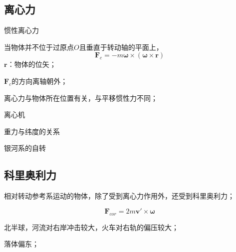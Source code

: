 \documentclass[12pt,a4paper]{article}
\renewcommand{\vec}[1]{\boldsymbol{#1}}
\begin{document}
\subsection{离心力}
惯性离心力

当物体并不位于过原点$O$且垂直于转动轴的平面上，
\begin{equation}
\vec{F}_c = -m\vec{\omega} \times (\vec{\omega} \times \vec{r})
\end{equation}
$\vec{r}$：物体的位矢；

$\vec{F}_c$的方向离轴朝外；

离心力与物体所在位置有关，与平移惯性力不同；

离心机

重力与纬度的关系

银河系的自转


\subsection{科里奥利力}
相对转动参考系运动的物体，除了受到离心力作用外，还受到科里奥利力；

\begin{equation}
\vec{F}_{cor} = 2m\vec{v}' \times \vec{\omega}
\end{equation}

北半球，河流对右岸冲击较大，火车对右轨的偏压较大；

落体偏东；
\end{document}

